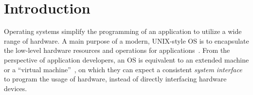 \chapter{Introduction}
\label{chap:intro}


Operating systems simplify the programming of an application to utilize a wide range of hardware.
A main purpose of a modern, UNIX-style OS
is to encapsulate the low-level hardware resources and operations for applications~\cite{ritchie74unix}.
From the perspective of application developers,
an OS is equivalent to 
an extended machine or a ``virtual machine''~\cite{tanenbaum19os-textbook,dhamdhere2007os-textbook},
on which they can expect a consistent {\em system interface} to program the usage of hardware,
instead of directly interfacing hardware devices.
